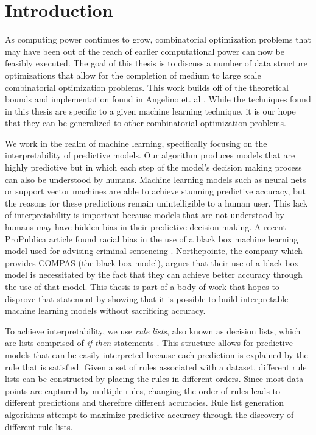 \chapter{Introduction}
\label{introduction}

As computing power continues to grow, combinatorial optimization problems that may have been out of the reach of earlier computational power can now be feasibly executed.
The goal of this thesis is to discuss a number of data structure optimizations that allow for the completion of medium to large scale combinatorial optimization problems.
This work builds off of the theoretical bounds and implementation found in Angelino et. al \cite{AngelinoLaAlSeRu17}.
While the techniques found in this thesis are specific to a given machine learning technique, it is our hope that they can be generalized to other combinatorial optimization problems.

We work in the realm of machine learning, specifically focusing on the interpretability of predictive models.
Our algorithm produces models that are highly predictive but in which each step of the model's decision making process can also be understood by humans.
Machine learning models such as neural nets or support vector machines are able to achieve stunning predictive accuracy, but the reasons for these predictions remain unintelligible to a human user.
This lack of interpretability is important because models that are not understood by humans may have hidden bias in their predictive decision making.
A recent ProPublica article found racial bias in the use of a black box machine learning model used for advising criminal sentencing \cite{LarsonMaKiAn16}.
Northepointe, the company which provides COMPAS (the black box model), argues that their use of a black box model is necessitated by the fact that they can achieve better accuracy through the use of that model.
This thesis is part of a body of work that hopes to disprove that statement by showing that it is possible to build interpretable machine learning models without sacrificing accuracy.

To achieve interpretability, we use \emph{rule lists}, also known as decision lists, which are lists comprised of \emph{if-then} statements \cite{Rivest87}. 
This structure allows for predictive models that can be easily interpreted because each prediction is explained by the rule that is satisfied. 
Given a set of rules associated with a dataset, different rule lists can be constructed by placing the rules in different orders.
Since most data points are captured by multiple rules, changing the order of rules leads to different predictions and therefore different accuracies. 
Rule list generation algorithms attempt to maximize predictive accuracy through the discovery of different rule lists.

